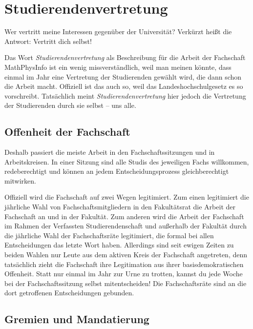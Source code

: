 \vspace*{-2mm}
\section[Studierendenvertretung in der Fachschaft]{Studierendenvertretung}
\vspace*{-1mm}
Wer vertritt meine Interessen gegenüber der Universität? Verkürzt heißt die Antwort: Vertritt dich selbst!

Das Wort \emph{Studierendenvertretung} als Beschreibung für die Arbeit der Fachschaft MathPhysInfo ist ein wenig missverständlich, weil man meinen könnte, dass einmal im Jahr eine Vertretung der Studierenden gewählt wird, die dann schon die Arbeit macht. Offiziell ist das auch so, weil das Landeshochschulgesetz es so vorschreibt. Tatsächlich meint \emph{Studierendenvertretung} hier jedoch die Vertretung der Studierenden durch sie selbst -- uns alle.

\vspace*{-2mm}
\subsection{Offenheit der Fachschaft}
Deshalb passiert die meiste Arbeit in den Fachschaftssitzungen und in Arbeitskreisen. In einer Sitzung sind alle Studis des jeweiligen Fachs willkommen, redeberechtigt und können an jedem Entscheidungsprozess gleichberechtigt mitwirken.

Offiziell wird die Fachschaft auf zwei Wegen legitimiert. Zum einen legitimiert die jährliche Wahl von Fachschaftsmitgliedern in den Fakultätsrat die Arbeit der Fachschaft an und in der Fakultät. Zum anderen wird die Arbeit der Fachschaft im Rahmen der Verfassten Studierendenschaft und außerhalb der Fakultät durch die jährliche Wahl der Fachschaftsräte legitimiert, die formal bei allen Entscheidungen das letzte Wort haben. Allerdings sind seit ewigen Zeiten zu beiden Wahlen nur Leute aus dem aktiven Kreis der Fachschaft angetreten, denn tatsächlich zieht die Fachschaft ihre Legitimation aus ihrer basisdemokratischen Offenheit. Statt nur einmal im Jahr zur Urne zu trotten, kannst du jede Woche bei der Fachschaftssitzung selbst mitentscheiden! Die Fachschaftsräte sind an die dort getroffenen Entscheidungen gebunden.
\vspace*{-2mm}
\subsection{Gremien und Mandatierung}

